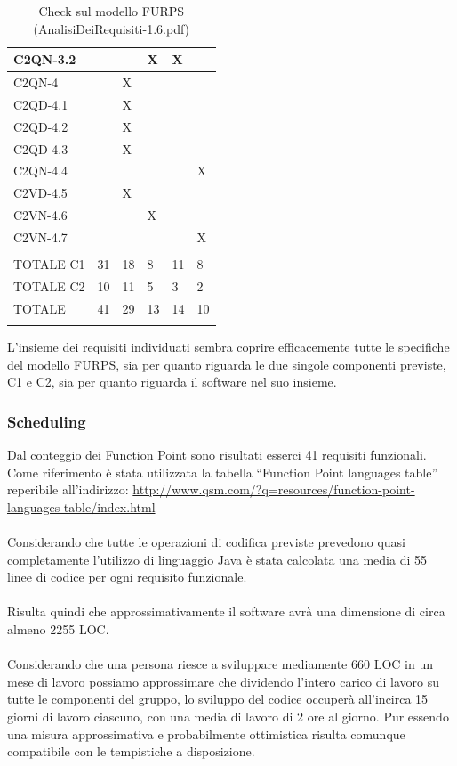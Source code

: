 \begin{footnotesize}
\begin{longtable}{|p{}|p{}|p{}|p{}|p{}|p{}|}
 C2QN-3.2& &  &  X&  X&  \\ \hline
 C2QN-4& &  X&  &  &  \\ \hline
 C2QD-4.1& &  X&  &  &  \\ \hline
 C2QD-4.2& &  X&  &  &  \\ \hline
 C2QD-4.3& &  X&  &  &  \\ \hline
 C2QN-4.4& &  &  &  &  X\\ \hline
 C2VD-4.5& &  X&  &  &  \\ \hline
 C2VN-4.6& &  &  X&  &  \\ \hline
 C2VN-4.7& &  &  &  &  X\\ \hline
         & &  &  &  &  \\ \hline
 TOTALE C1& 31&  18&  8&  11&  8\\ \hline
 TOTALE C2& 10&  11&  5&  3&  2\\ \hline
 TOTALE& 41&  29&  13&  14&  10\\ \hline
\caption{Check sul modello FURPS (AnalisiDeiRequisiti-1.6.pdf)}
\end{longtable}
\end{footnotesize}

L'insieme dei requisiti individuati sembra coprire efficacemente tutte le
specifiche del modello FURPS, sia per quanto riguarda le due singole componenti
previste, C1 e C2, sia per quanto riguarda il software nel suo insieme.

\subsubsection*{Scheduling}

Dal conteggio dei Function Point sono risultati esserci 41 requisiti
funzionali. Come riferimento \`e stata utilizzata la tabella ``Function Point
languages table'' reperibile all'indirizzo:
\url{http://www.qsm.com/?q=resources/function-point-languages-table/index.html}
\\\\
Considerando che tutte le operazioni di codifica previste prevedono quasi
completamente l'utilizzo di linguaggio Java \`e stata calcolata una media di 55
linee di codice per ogni requisito funzionale.
\\\\
Risulta quindi che approssimativamente il software avr\`a una dimensione di
circa almeno 2255 LOC.
\\\\
Considerando che una persona riesce a sviluppare mediamente 660 LOC in un mese
di lavoro possiamo approssimare che dividendo l'intero carico di lavoro su tutte le
componenti del gruppo, lo sviluppo del codice occuper\`a all'incirca
15 giorni di lavoro ciascuno, con una media di lavoro di 2 ore al giorno. Pur
essendo una misura approssimativa e probabilmente ottimistica risulta comunque
compatibile con le tempistiche a disposizione.

